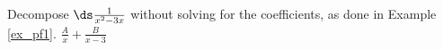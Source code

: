 {Decompose $\ds \frac{1}{x^2-3x}$ without solving for the coefficients, as done in Example \ref{ex_pf1}.}
{$\frac{A}{x} + \frac{B}{x-3}$}
